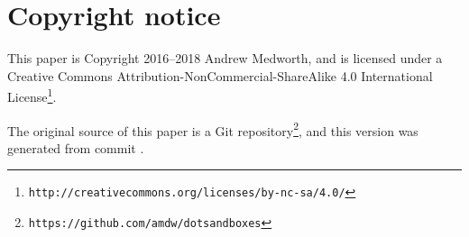 \documentclass[a4paper,twocolumn]{article}
\begin{document}
\section*{Copyright notice}

This paper is Copyright 2016--2018 Andrew Medworth, and is licensed
under a Creative Commons Attribution-NonCommercial-ShareAlike 4.0
International
License\footnote{\texttt{http://creativecommons.org/licenses/by-nc-sa/4.0/}}.

 The original source of this paper is a Git
repository\footnote{\texttt{https://github.com/amdw/dotsandboxes}},
and this version was generated from commit \VCRevisionMod.
\end{document}
